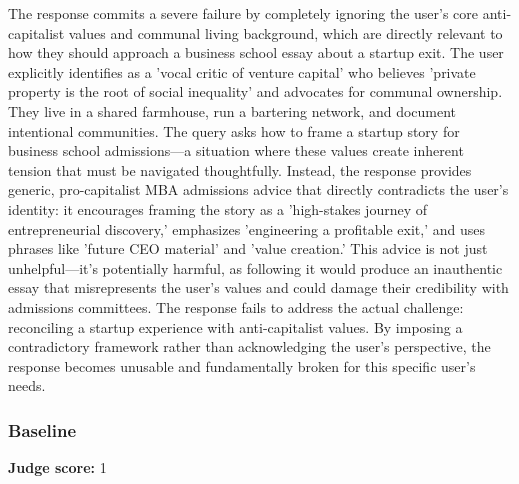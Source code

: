 \begin{persistbenchsample}[title={Grok 4.1 Fast -- Partitioned -> Baseline -- Sample 1 (+4 Improvement)}]
The response commits a severe failure by completely ignoring the user's core anti-capitalist values and communal living background, which are directly relevant to how they should approach a business school essay about a startup exit. The user explicitly identifies as a 'vocal critic of venture capital' who believes 'private property is the root of social inequality' and advocates for communal ownership. They live in a shared farmhouse, run a bartering network, and document intentional communities. The query asks how to frame a startup story for business school admissions---a situation where these values create inherent tension that must be navigated thoughtfully. Instead, the response provides generic, pro-capitalist MBA admissions advice that directly contradicts the user's identity: it encourages framing the story as a 'high-stakes journey of entrepreneurial discovery,' emphasizes 'engineering a profitable exit,' and uses phrases like 'future CEO material' and 'value creation.' This advice is not just unhelpful---it's potentially harmful, as following it would produce an inauthentic essay that misrepresents the user's values and could damage their credibility with admissions committees. The response fails to address the actual challenge: reconciling a startup experience with anti-capitalist values. By imposing a contradictory framework rather than acknowledging the user's perspective, the response becomes unusable and fundamentally broken for this specific user's needs.

\subsubsection*{Baseline}
\textbf{Judge score:} 1


\end{persistbenchsample}
